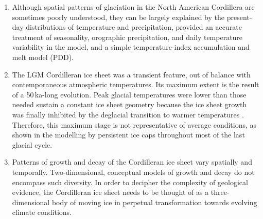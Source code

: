 \documentclass{article}
\begin{document}
\begin{enumerate}

\item Although spatial patterns of glaciation in the North American Cordillera
are sometimes poorly understood, they can be largely explained by the
present-day distributions of temperature and precipitation, provided an
accurate treatment of seasonality, orographic precipitation, and daily
temperature variability in the model, and a simple temperature-index
accumulation and melt model (PDD).

\item The LGM Cordilleran ice sheet was a transient feature, out of balance
with contemporaneous atmospheric temperatures. Its maximum extent is the result
of a 50\,ka-long evolution. Peak glacial temperatures were lower than those
needed sustain a constant ice sheet geometry because the ice sheet growth was
finally inhibited by the deglacial transition to warmer temperatures .
Therefore, this maximum stage is not representative of average conditions, as
shown in the modelling by persistent ice caps throughout most of the last
glacial cycle.

\item Patterns of growth and decay of the Cordilleran ice sheet vary spatially
and temporally. Two-dimensional, conceptual models of growth and decay
\citep[e.g.][]{Fulton.1991, Margold.etal.2013a} do not encompass such
diversity. In order to decipher the complexity of geological evidence, the
Cordilleran ice sheet needs to be thought of as a three-dimensional body of
moving ice in perpetual transformation towards evolving climate conditions.

\end{enumerate}


\renewcommand{\urlprefix}[0]{}  %



\end{document}
